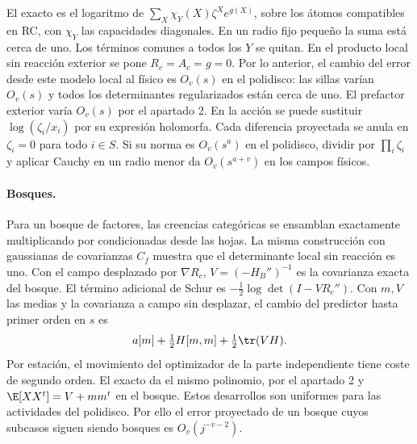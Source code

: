 El exacto es el logaritmo de $\sum_X \chi_Y(X)\zeta^X e^{g(X)}$, sobre los átomos
compatibles en RC, con $\chi_Y$ las capacidades diagonales. En un radio fijo pequeño
la suma está cerca de uno. Los términos comunes a todos los $Y$ se quitan.
En el producto local sin reacción exterior se pone $R_c=A_c=g=0$.
Por lo anterior, el cambio del error desde este modelo local al físico es $O_v(s)$
en el polidisco: las sillas varían $O_v(s)$ y todos los determinantes regularizados
están cerca de uno. El prefactor exterior varía $O_v(s)$ por el apartado 2.
En la acción se puede sustituir $\log(\zeta_i/x_i)$ por su expresión holomorfa.
Cada diferencia proyectada se anula en $\zeta_i=0$ para todo $i\in S$. Si su
norma es $O_v(s^a)$ en el polidisco, dividir por $\prod_i\zeta_i$ y aplicar Cauchy
en un radio menor da $O_v(s^{a+v})$ en los campos físicos.

\paragraph{Bosques.}
Para un bosque de factores, las creencias categóricas se ensamblan exactamente
multiplicando por condicionadas desde las hojas. La misma construcción con
gaussianas de covarianzas $C_f$ muestra que el determinante local sin reacción
es uno. Con el campo desplazado por $\nabla R_c$, $V=(-H_B'')^{-1}$ es la
covarianza exacta del bosque. El término adicional de Schur es
$-\frac12\log\det(I-VR_c'')$. Con $m,V$ las medias y la covarianza a campo sin
desplazar, el cambio del predictor hasta primer orden en $s$ es
\[
 a[m]+\tfrac12 H[m,m]+\tfrac12\tr(VH).
\]
Por estación, el movimiento del optimizador de la parte independiente tiene
coste de segundo orden. El exacto da el mismo polinomio, por el apartado 2 y
$\E[XX^t]=V+mm^t$ en el bosque. Estos desarrollos son uniformes para las
actividades del polidisco. Por ello el error proyectado de un bosque cuyos
subcasos siguen siendo bosques es $O_v(j^{-v-2})$.
